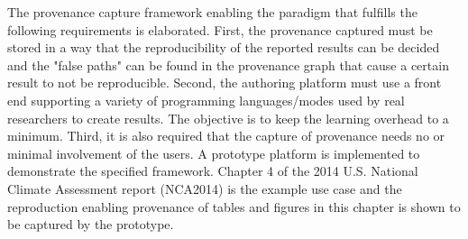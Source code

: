 The provenance capture framework enabling the paradigm that fulfills the following requirements is elaborated. First, the provenance captured must be stored in a way that the reproducibility of the reported results can be decided and the "false paths" can be found in the provenance graph that cause a certain result to not be reproducible. Second, the authoring platform must use a front end supporting a variety of programming languages/modes used by real researchers to create results. The objective is to keep the learning overhead to a minimum. Third, it is also required that the capture of provenance needs no or minimal involvement of the users. A prototype platform is implemented to demonstrate the specified framework. Chapter 4 of the 2014 U.S. National Climate Assessment report (NCA2014) is the example use case and the reproduction enabling provenance of tables and figures in this chapter is shown to be captured by the prototype.




